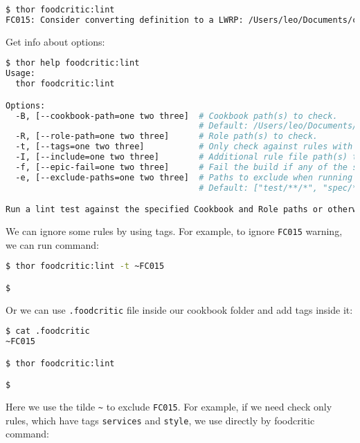 \begin{lstlisting}[language=Bash,label=lst:testing-thor4]
$ thor foodcritic:lint
FC015: Consider converting definition to a LWRP: /Users/leo/Documents/chef_book/code/my-server-cloud/site-cookbooks/my_cool_app/definitions/enable_web_site.rb:1
\end{lstlisting}

Get info about options:

\begin{lstlisting}[language=Bash,label=lst:testing-thor5]
$ thor help foodcritic:lint
Usage:
  thor foodcritic:lint

Options:
  -B, [--cookbook-path=one two three]  # Cookbook path(s) to check.
                                       # Default: /Users/leo/Documents/chef_book/code/my-server-cloud/site-cookbooks/my_cool_app
  -R, [--role-path=one two three]      # Role path(s) to check.
  -t, [--tags=one two three]           # Only check against rules with the specified tags.
  -I, [--include=one two three]        # Additional rule file path(s) to load.
  -f, [--epic-fail=one two three]      # Fail the build if any of the specified tags are matched.
  -e, [--exclude-paths=one two three]  # Paths to exclude when running tests.
                                       # Default: ["test/**/*", "spec/**/*", "features/**/*"]

Run a lint test against the specified Cookbook and Role paths or otherwise your current working directory.
\end{lstlisting}

We can ignore some rules by using tags. For example, to ignore \lstinline!FC015! warning, we can run command:

\begin{lstlisting}[language=Bash,label=lst:testing-thor6]
$ thor foodcritic:lint -t ~FC015

$
\end{lstlisting}

Or we can use \lstinline!.foodcritic! file inside our cookbook folder and add tags inside it:

\begin{lstlisting}[language=Bash,label=lst:testing-thor7]
$ cat .foodcritic
~FC015

$ thor foodcritic:lint

$
\end{lstlisting}

Here we use the tilde \lstinline!~! to exclude \lstinline!FC015!.
For example, if we need check only rules, which have tags \lstinline!services! and \lstinline!style!, we use directly by foodcritic command:

